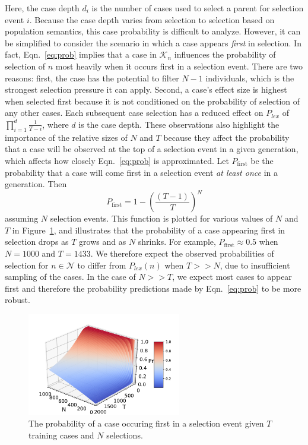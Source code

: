 \documentclass[twoside]{article}
\begin{document}
Here, the case depth $d_i$ is the number of cases used to select a parent for selection event $i$. Because the case depth varies from selection to selection based on population semantics, this case probability is difficult to analyze. However, it can be simplified to consider the scenario in which a case appears {\it first} in selection. In fact, Eqn.~\ref{eq:prob} implies that a case in $\mathcal{K}_n$ influences the probability of selection of $n$ most heavily when it occurs first in a selection event. There are two reasons: first, the case has the potential to filter $N-1$ individuals, which is the strongest selection pressure it can apply. Second, a case's effect size is highest when selected first because it is not conditioned on the probability of selection of any other cases. Each subsequent case selection has a reduced effect on $P_{lex}$ of $\prod_{i=1}^d{\frac{1}{T-i}}$, where $d$ is the case depth. These observations also highlight the importance of the relative sizes of $N$ and $T$ because they affect the probability that a case will be observed at the top of a selection event in a given generation, which affects how closely Eqn.~\ref{eq:prob} is approximated. Let $P_{\text{first}}$ be the probability that a case will come first in a selection event {\it at least once} in a generation. Then
\begin{equation}\label{eq:prob_case}
P_{\text{first}} = 1 - \left(\frac{(T-1)}{T}\right)^N
\end{equation}
assuming $N$ selection events. This function is plotted for various values of $N$ and $T$ in Figure~\ref{fig:prob_first}, and illustrates that the probability of a case appearing first in selection drops as $T$ grows and as $N$ shrinks. For example, $P_{\text{first}} \approx 0.5$ when $N=1000$ and $T=1433$. We therefore expect the observed probabilities of selection for $n \in \mathcal{N}$ to differ from $P_{lex}(n)$ when $T >> N$, due to insufficient sampling of the cases. In the case of $N >> T$, we expect most cases to appear first and therefore the probability predictions made by Eqn.~\ref{eq:prob} to be more robust. 

\begin{figure}
\centering
  \includegraphics[width = 0.6\textwidth]{figs/prob_case_first.pdf}
  \caption{The probability of a case occuring first in a selection event given $T$ training cases and $N$ selections.}\label{fig:prob_first}
\end{figure}
\end{document}
